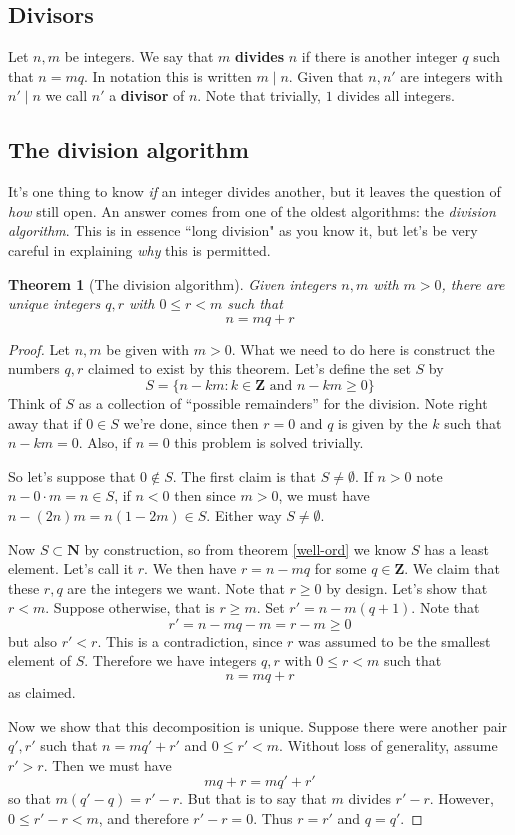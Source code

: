 \documentclass[12pt]{article}
\numberwithin{equation}{subsection}
\newtheorem{thm}[subsection]{Theorem}
\theoremstyle{note}
\begin{document}
\subsection{Divisors}
Let $n,m$ be integers. We say that $m$ \textbf{divides} $n$ if there is another integer $q$ such that $n=mq$. In notation this is written $m \mid n$. Given that $n,n'$ are integers with $n'\mid n$ we call $n'$ a \textbf{divisor} of $n$. Note that trivially, $1$ divides all integers. 

\subsection{The division algorithm}

It's one thing to know \textit{if} an integer divides another, but it leaves the question of \textit{how} still open. An answer comes from one of the oldest algorithms: the \textit{division algorithm}. This is in essence ``long division" as you know it, but let's be very careful in explaining \textit{why} this is permitted.

\begin{thm}[The division algorithm] \label{div-alg}
	Given integers $n,m$ with $m>0$, there are unique integers $q,r$ with $0\leq r< m$ such that \[ n = mq+r\]
\end{thm}

\begin{proof}
	Let $n,m$ be given with $m>0$. What we need to do here is construct the numbers $q,r$ claimed to exist by this theorem. Let's define the set $S$ by \[ S= \{n-km : k\in \mathbf{Z} \text{ and } n-km\geq 0\}\] Think of $S$ as a collection of ``possible remainders'' for the division. Note right away that if $0\in{S}$ we're done, since then $r=0$ and $q$ is given by the $k$ such that $n-km=0$. Also, if $n=0$ this problem is solved trivially. 
	
	So let's suppose that $0\notin S$. The first claim is that $S\neq \emptyset$. If $n>0$ note $n-0\cdot m =n\in S$, if $n<0$ then since $m>0$, we must have $n-(2n)m=n(1-2m)\in S$. Either way $S\neq \emptyset$. 
	
	Now $S\subset \mathbf{N}$ by construction, so from theorem \ref{well-ord} we know $S$ has a least element. Let's call it $r$. We then have $r=n-mq$ for some $q\in \mathbf{Z}$. We claim that these $r,q$ are the integers we want. Note that $r\geq 0$ by design. Let's show that $r<m$. Suppose otherwise, that is $r\geq m$. Set $r'=n-m(q+1)$. Note that \[ r'=n-mq-m=r-m\geq 0\] but also $r'<r$. This is a contradiction, since $r$ was assumed to be the smallest element of $S$. Therefore we have integers $q,r$ with $0\leq r<m$ such that  \[ n=mq+r\] as claimed.
	
	Now we show that this decomposition is unique. Suppose there were another pair $q',r'$ such that $n=mq'+r'$ and $0\leq r' < m$. Without loss of generality, assume $r'>r$. Then we must have \[ mq+r=mq'+r'\] so that $m(q'-q)=r'-r$. But that is to say that $m$ divides $r'-r$. However, $0\leq r'-r< m$, and therefore $r'-r=0$. Thus $r=r'$ and $q=q'$.
\end{proof}
\end{document}
